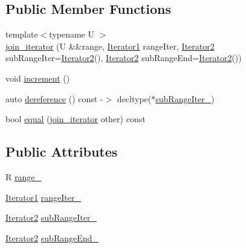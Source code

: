 \subsection*{Public Member Functions}
\begin{DoxyCompactItemize}
\item 
{\footnotesize template$<$typename U $>$ }\\\mbox{\hyperlink{structrah_1_1view_1_1join__iterator_a3413f5a25f3c86b1d85ad9335e6e8e39}{join\+\_\+iterator}} (U \&\&range, \mbox{\hyperlink{structrah_1_1view_1_1join__iterator_a8b71c6f25eee2915e2a8afc6e024196d}{Iterator1}} range\+Iter, \mbox{\hyperlink{structrah_1_1view_1_1join__iterator_ae03a066174f3422c70d0e3c22e68d9f7}{Iterator2}} sub\+Range\+Iter=\mbox{\hyperlink{structrah_1_1view_1_1join__iterator_ae03a066174f3422c70d0e3c22e68d9f7}{Iterator2}}(), \mbox{\hyperlink{structrah_1_1view_1_1join__iterator_ae03a066174f3422c70d0e3c22e68d9f7}{Iterator2}} sub\+Range\+End=\mbox{\hyperlink{structrah_1_1view_1_1join__iterator_ae03a066174f3422c70d0e3c22e68d9f7}{Iterator2}}())
\item 
void \mbox{\hyperlink{structrah_1_1view_1_1join__iterator_a4f81464b6ff2707bb21d2bbd409c4f4d}{increment}} ()
\item 
auto \mbox{\hyperlink{structrah_1_1view_1_1join__iterator_af0786d44ba77073702b8d3c856232ffa}{dereference}} () const -\/$>$ decltype($\ast$\mbox{\hyperlink{structrah_1_1view_1_1join__iterator_a49b089a83af39b5f6893f57ad4a1d81c}{sub\+Range\+Iter\+\_\+}})
\item 
bool \mbox{\hyperlink{structrah_1_1view_1_1join__iterator_a76c4e51e7c191e189e01d15eff2b7055}{equal}} (\mbox{\hyperlink{structrah_1_1view_1_1join__iterator}{join\+\_\+iterator}} other) const
\end{DoxyCompactItemize}
\subsection*{Public Attributes}
\begin{DoxyCompactItemize}
\item 
R \mbox{\hyperlink{structrah_1_1view_1_1join__iterator_ad167fb9c44c21ad59d5acfa9031e9153}{range\+\_\+}}
\item 
\mbox{\hyperlink{structrah_1_1view_1_1join__iterator_a8b71c6f25eee2915e2a8afc6e024196d}{Iterator1}} \mbox{\hyperlink{structrah_1_1view_1_1join__iterator_a754b7bdee5ca2b23868a402c2c3cfcc2}{range\+Iter\+\_\+}}
\item 
\mbox{\hyperlink{structrah_1_1view_1_1join__iterator_ae03a066174f3422c70d0e3c22e68d9f7}{Iterator2}} \mbox{\hyperlink{structrah_1_1view_1_1join__iterator_a49b089a83af39b5f6893f57ad4a1d81c}{sub\+Range\+Iter\+\_\+}}
\item 
\mbox{\hyperlink{structrah_1_1view_1_1join__iterator_ae03a066174f3422c70d0e3c22e68d9f7}{Iterator2}} \mbox{\hyperlink{structrah_1_1view_1_1join__iterator_a70b890cac5aaa7c6f65f8c8efe369f0d}{sub\+Range\+End\+\_\+}}
\end{DoxyCompactItemize}


